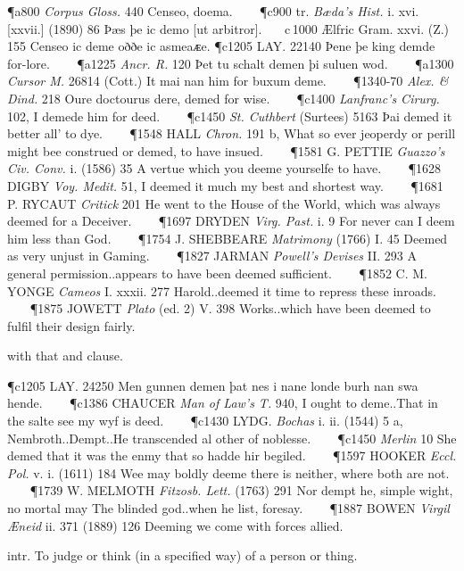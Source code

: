 \begin{description}[wide, labelwidth=!, labelindent=0pt]
\begin{myenumerate}
\P a800 \textit{Corpus Gloss.} 440 Censeo, doema.    
\P c900 tr. \textit{Bæda's Hist.} i. xvi. [xxvii.] (1890) 86 Þæs þe ic demo [ut arbitror].    c 1000 Ælfric Gram. xxvi. (Z.) 155 Censeo ic deme oððe ic asmeaᴁe. 
\P c1205 LAY. 22140 Þene þe king demde for-lore.    
\P a1225  \textit{Ancr. R.} 120 Þet tu schalt demen þi suluen wod.    
\P a1300  \textit{Cursor M.} 26814 (Cott.) It mai nan him for buxum deme.    
\P 1340-70  \textit{Alex. \& Dind.} 218 Oure doctourus dere, demed for wise.    
\P c1400 \textit{Lanfranc's  Cirurg.} 102, I demede him for deed.    
\P c1450  \textit{St. Cuthbert} (Surtees) 5163 Þai demed it better all' to dye.    
\P 1548 HALL  \textit{Chron.} 191 b, What so ever jeoperdy or perill might bee construed or demed, to have insued.    
\P 1581 G. PETTIE  \textit{Guazzo's Civ. Conv.} i. (1586) 35 A vertue which you deeme yourselfe to have.    
\P 1628 DIGBY  \textit{Voy. Medit.} 51, I deemed it much my best and shortest way.    
\P 1681 P. RYCAUT  \textit{Critick} 201 He went to the House of the World, which was always deemed for a Deceiver.    
\P 1697 DRYDEN  \textit{Virg. Past.} i. 9 For never can I deem him less than God.    
\P 1754 J. SHEBBEARE  \textit{Matrimony} (1766) I. 45 Deemed as very unjust in Gaming.    
\P 1827 JARMAN  \textit{Powell's Devises} II. 293 A general permission..appears to have been deemed sufficient.    
\P 1852 C. M. YONGE  \textit{Cameos} I. xxxii. 277 Harold..deemed it time to repress these inroads.    
\P 1875 JOWETT  \textit{Plato} (ed. 2) V. 398 Works..which have been deemed to fulfil their design fairly.

 with that and clause.

\P c1205 LAY. 24250 Men gunnen demen þat nes i nane londe burh nan swa hende.    
\P c1386 CHAUCER  \textit{Man of Law's T.} 940, I ought to deme..That in the salte see my wyf is deed.    
\P c1430 LYDG.  \textit{Bochas} i. ii. (1544) 5 a, Nembroth..Dempt..He transcended al other of noblesse.    
\P c1450  \textit{Merlin} 10 She demed that it was the enmy that so hadde hir begiled.    
\P 1597 HOOKER  \textit{Eccl. Pol.} v. i. (1611) 184 Wee may boldly deeme there is neither, where both are not.    
\P 1739 W. MELMOTH  \textit{Fitzosb. Lett.} (1763) 291 Nor dempt he, simple wight, no mortal may The blinded god..when he list, foresay.    
\P 1887 BOWEN  \textit{Virgil Æneid} ii. 371 (1889) 126 Deeming we come with forces allied.

 intr. To judge or think (in a specified way) of a person or thing.


\end{myenumerate}
\end{description}
